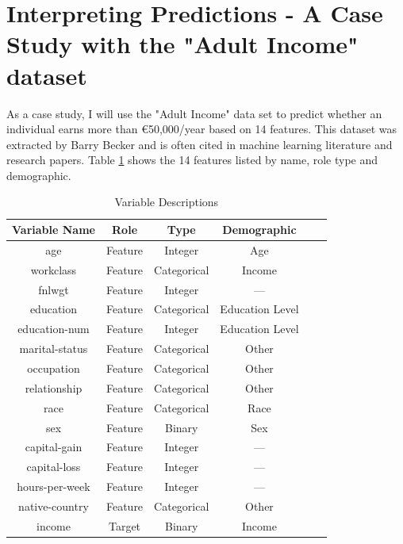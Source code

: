 \documentclass[10pt,journal,compsoc]{IEEEtran}
\begin{document}
\section{Interpreting Predictions - A Case Study with the "Adult Income" dataset}
As a case study, I will use the "Adult Income" data set\cite{misc_adult_2} to predict whether an individual earns more than €50,000/year based on 14 features. This dataset was extracted by Barry Becker and is often cited in machine learning literature and research papers.
Table \ref{tab:variable-descriptions} shows the 14 features listed by name, role type and demographic.

\begin{table}[h]
    \centering
    \caption{Variable Descriptions}
    \begin{tabularx}{\columnwidth}{cccccc}
        \toprule
        \textbf{Variable Name} & \textbf{Role} & \textbf{Type} & \textbf{Demographic} \\
        \midrule
        age                    & Feature       & Integer       & Age                  \\
        workclass              & Feature       & Categorical   & Income               \\
        fnlwgt                 & Feature       & Integer       & ---                  \\
        education              & Feature       & Categorical   & Education Level      \\
        education-num          & Feature       & Integer       & Education Level      \\
        marital-status         & Feature       & Categorical   & Other                \\
        occupation             & Feature       & Categorical   & Other                \\
        relationship           & Feature       & Categorical   & Other                \\
        race                   & Feature       & Categorical   & Race                 \\
        sex                    & Feature       & Binary        & Sex                  \\
        capital-gain           & Feature       & Integer       & ---                  \\
        capital-loss           & Feature       & Integer       & ---                  \\
        hours-per-week         & Feature       & Integer       & ---                  \\
        native-country         & Feature       & Categorical   & Other                \\
        income                 & Target        & Binary        & Income               \\
        \bottomrule
    \end{tabularx}
    \label{tab:variable-descriptions}
\end{table}
\end{document}
